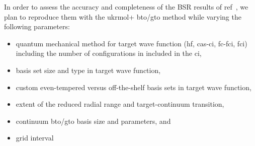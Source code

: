 \documentclass[12pt]{article}
\begin{document}
In order to assess the accuracy and completeness of the BSR results of ref~\cite{wang2014}, we plan to reproduce them with the \ac{ukrmol+}
				\ac{bto}/\ac{gto} method while varying the following parameters: 
				\begin{itemize}
						\item quantum mechanical method for target wave function (\ac{hf}, 
								\ac{cas}-\ac{ci}, \ac{fc}-\ac{fci}, \ac{fci}) including the number of configurations in included in the \ac{ci},
						\item basis set size and type in target wave function,
						\item custom even-tempered versus off-the-shelf basis sets in target
								wave function, 
						\item extent of the reduced radial range and target-continuum transition,
						\item continuum \ac{bto}/\ac{gto} basis size and parameters, and
						\item \bspline{} grid interval
				\end{itemize} 
\end{document}
